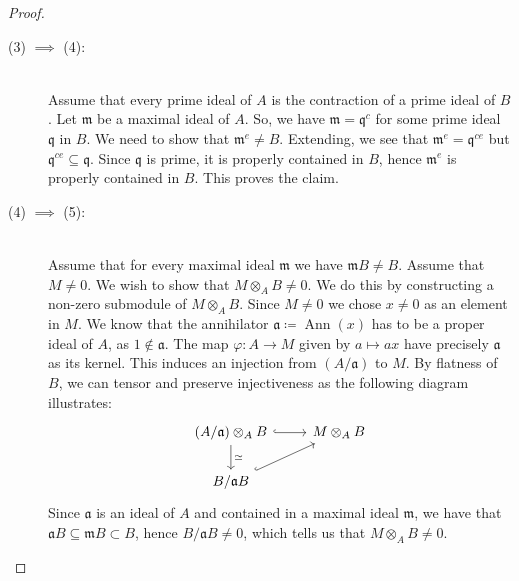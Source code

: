 \documentclass{article}
\newcommand{\m}{\mathfrak{m}}
\newcommand{\q}{\mathfrak{q}}
\newcommand{\tensor}{\otimes}
\renewcommand{\a}{\mathfrak{a}}
\DeclareMathOperator{\Ann}{Ann}
\begin{document}
\begin{proof}
\begin{description}
            \item[(3) $\implies$ (4):]\hfill \\
                Assume that every prime ideal of $A$ is the contraction of a
                prime ideal of $B$. Let $\m$ be a maximal ideal of $A$. So, we
                have $\m = \q^c$ for some prime ideal $\q$ in $B$. We need to
                show that $\m^e \neq B$. Extending, we see that $\m^e =
                \q^{ce}$ but $\q^{ce} \subseteq \q$. Since $\q$ is prime, it is
                properly contained in $B$, hence $\m^e$ is properly contained
                in $B$. This proves the claim.

            \item [(4) $\implies$ (5):]\hfill \\
                Assume that for every maximal ideal $\m$ we have $\m B \neq B$.
                Assume that $M \neq 0$. We wish to show that $M \tensor_A B
                \neq 0$. We do this by constructing a non-zero submodule of $M
                \tensor_A B$. Since $M \neq 0$ we chose $x \neq 0$ as an
                element in $M$. We know that the annihilator $\a \coloneqq
                \Ann(x)$ has to be a proper ideal of $A$, as $1 \notin \a$.
                The map $\varphi\colon A \to M$ given by $a \mapsto ax$ have
                precisely $\a$ as its kernel. This induces an injection from
                $(A / \a)$ to $M$. By flatness of $B$, we can tensor and
                preserve injectiveness as the following diagram illustrates:
                \begin{equation}
                    \notag
                    \begin{tikzcd}
                        (A / \a) \tensor_A B \ar[r, hookrightarrow] \ar[d, "\simeq"] & M \tensor_A B \\
                        B / \a B \ar[ur, hookrightarrow]
                    \end{tikzcd}
                \end{equation}
                Since $\a$ is an ideal of $A$ and contained in a maximal ideal
                $\m$, we have that $\a B \subseteq \m B \subset B$, hence $B /
                \a B \neq 0$, which tells us that $M \tensor_A B \neq 0$.


\end{description}
\end{proof}
\end{document}
